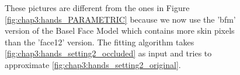 \begin{figure}[H]
	\centering
	\qquad
	\caption{These pictures are different from the ones in Figure \ref{fig:chap3:hands_PARAMETRIC} because we now use the 'bfm' version of the Basel Face Model which contains more skin pixels than the 'face12' version. The fitting algorithm takes \ref{fig:chap3:hands_setting2_occluded} as input and tries to approximate \ref{fig:chap3:hands_setting2_original}.}
	\label{fig:chap3:hands_setting2_PARAMETRIC}
\end{figure}

